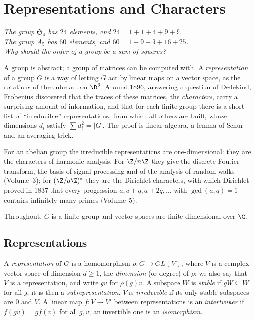 \chapter{Representations and Characters}

\begin{center}\itshape
The group $\mathfrak S_4$ has $24$ elements, and $24=1+1+4+9+9$.\\
The group $A_5$ has $60$ elements, and $60=1+9+9+16+25$.\\
Why should the order of a group be a sum of squares?
\end{center}

A group is abstract; a group of matrices can be computed with. A \emph{representation} of a group $G$ is a way of letting $G$ act by linear maps on a vector space, as the rotations of the cube act on $\R^3$. Around 1896, answering a question of Dedekind, Frobenius discovered that the traces of these matrices, the \emph{characters}, carry a surprising amount of information, and that for each finite group there is a short list of ``irreducible'' representations, from which all others are built, whose dimensions $d_i$ satisfy $\sum d_i^2=|G|$. The proof is linear algebra, a lemma of Schur and an averaging trick.

For an abelian group the irreducible representations are one-dimensional: they are the characters of harmonic analysis. For $\Z/n\Z$ they give the discrete Fourier transform, the basis of signal processing and of the analysis of random walks (Volume~3); for $(\Z/q\Z)^*$ they are the Dirichlet characters, with which Dirichlet proved in 1837 that every progression $a,a+q,a+2q,\dots$ with $\gcd(a,q)=1$ contains infinitely many primes (Volume~5).

Throughout, $G$ is a finite group and vector spaces are finite-dimensional over $\C$.

\section{Representations}

\begin{definition}
A \emph{representation} of $G$ is a homomorphism $\rho:G\to GL(V)$, where $V$ is a complex vector space of dimension $d\ge1$, the \emph{dimension} (or degree) of $\rho$; we also say that $V$ is a representation, and write $gv$ for $\rho(g)v$. A subspace $W$ is \emph{stable} if $gW\subseteq W$ for all $g$; it is then a \emph{subrepresentation}. $V$ is \emph{irreducible} if its only stable subspaces are $0$ and $V$. A linear map $f:V\to V'$ between representations is an \emph{intertwiner} if $f(gv)=gf(v)$ for all $g,v$; an invertible one is an \emph{isomorphism}.
\end{definition}

